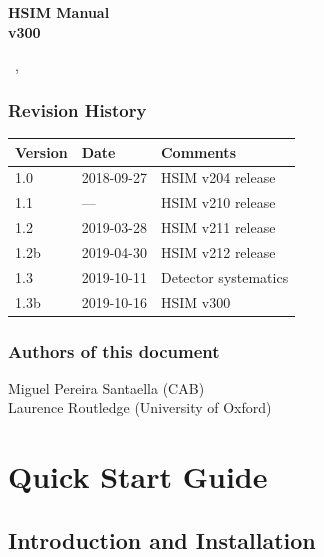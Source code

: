 \documentclass[12pt]{report}
\def\mydate{\leavevmode\hbox{\the\day~\monthname, \the\year}}
\begin{document}
\begin{titlepage}

\vspace*{4cm}
\begin{center}

{\selectfont
\Huge
\textbf{
HSIM Manual\\[0.5ex]
\Large
v300}
\vspace{2cm}

\large
\mydate
}
\end{center}
\vspace*{\fill}


\end{titlepage}

\tableofcontents

\vfill
\subsection*{Revision History}

\begin{table}[h]
\label{tab:revision}
\begin{tabular}{lll}
\hline
Version & Date & Comments \\
\hline
1.0 & 2018-09-27 & HSIM v204 release \\
1.1 & --- & HSIM v210 release \\
1.2 & 2019-03-28 & HSIM v211 release \\
1.2b & 2019-04-30 & HSIM v212 release \\
1.3 & 2019-10-11 & Detector systematics \\
1.3b & 2019-10-16 & HSIM v300 \\
\hline
\end{tabular}
\end{table}


\subsection*{Authors of this document}
Miguel Pereira Santaella (CAB) \\
Laurence Routledge (University of Oxford)

\clearpage

\chapter{Quick Start Guide}

\section{Introduction and Installation}
\end{document}
